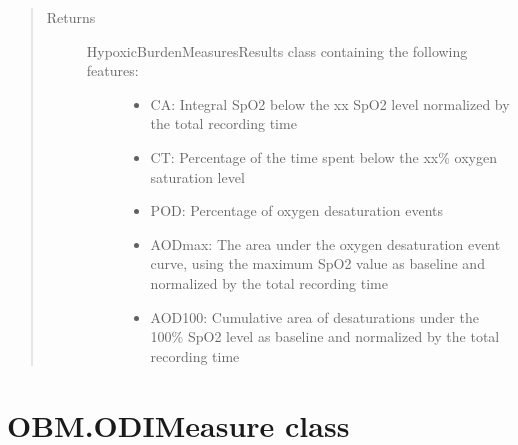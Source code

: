 \documentclass[letterpaper,10pt,english]{sphinxmanual}
\begin{document}
\begin{fulllineitems}
\begin{fulllineitems}
\begin{quote}
\begin{description}
\item[{Returns}] \leavevmode
\begin{description}
\item[{HypoxicBurdenMeasuresResults class containing the following features:}] \leavevmode\begin{itemize}
\item {} 
CA: Integral SpO2 below the xx SpO2 level normalized by the total recording time

\item {} 
CT: Percentage of the time spent below the xx\% oxygen saturation level

\item {} 
POD: Percentage of oxygen desaturation events

\item {} 
AODmax: The area under the oxygen desaturation event curve, using the maximum SpO2 value as baseline
and normalized by the total recording time

\item {} 
AOD100: Cumulative area of desaturations under the 100\% SpO2 level as baseline and normalized
by the total recording time

\end{itemize}

\end{description}


\end{description}\end{quote}

\end{fulllineitems}


\end{fulllineitems}



\section{OBM.ODIMeasure class}
\label{\detokenize{OBM:module-OBM.ODIMeasure}}\label{\detokenize{OBM:obm-odimeasure-class}}
\end{document}
